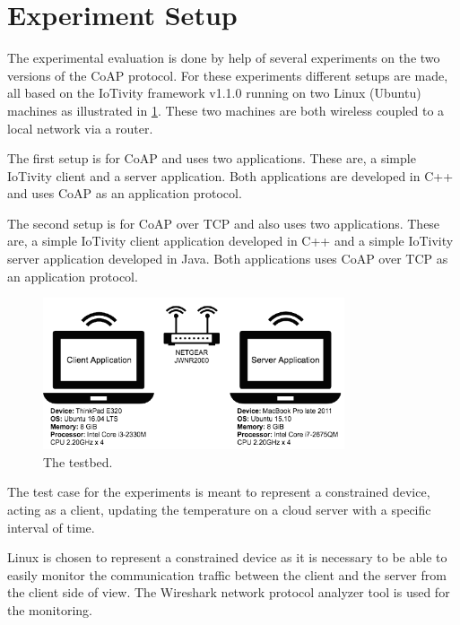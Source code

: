 \section{Experiment Setup}\label{sec:experimentsetup}
The experimental evaluation is done by help of several experiments on the two versions of the CoAP protocol. For these experiments different setups are made, all based on the IoTivity framework v1.1.0 running on two Linux (Ubuntu) machines as illustrated in \figurename \ref{fig:setup}. These two machines are both wireless coupled to a local network via a router. 

The first setup is for CoAP and uses two applications. These are, a simple IoTivity client and a server application. Both applications are developed in C++ and uses CoAP as an application protocol.

The second setup is for CoAP over TCP and also uses two applications. These are, a simple IoTivity client application developed in C++ and a simple IoTivity server application developed in Java. Both applications uses CoAP over TCP as an application protocol.

\begin{figure}[bht]
	\centering
	\includegraphics[width=3.5in]{gfx/setupa}
	\caption{The testbed.}
	\label{fig:setup}
\end{figure}

The test case for the experiments is meant to represent a constrained device, acting as a client, updating the temperature on a cloud server with a specific interval of time. 

Linux is chosen to represent a constrained device as it is necessary to be able to easily monitor the communication traffic between the client and the server from the client side of view.
The Wireshark network protocol analyzer tool is used for the monitoring.





